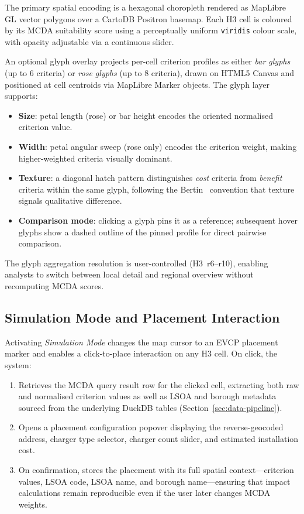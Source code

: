 The primary spatial encoding is a hexagonal choropleth rendered as MapLibre GL vector polygons over a CartoDB Positron basemap. Each H3 cell is coloured by its MCDA suitability score using a perceptually uniform \texttt{viridis} colour scale, with opacity adjustable via a continuous slider.

An optional glyph overlay projects per-cell criterion profiles as either \emph{bar glyphs} (up to 6 criteria) or \emph{rose glyphs} (up to 8 criteria), drawn on HTML5 Canvas and positioned at cell centroids via MapLibre Marker objects. The glyph layer supports:

\begin{itemize}[nosep]
    \item \textbf{Size}: petal length (rose) or bar height encodes the oriented normalised criterion value.
    \item \textbf{Width}: petal angular sweep (rose only) encodes the criterion weight, making higher-weighted criteria visually dominant.
    \item \textbf{Texture}: a diagonal hatch pattern distinguishes \emph{cost} criteria from \emph{benefit} criteria within the same glyph, following the Bertin~\cite{bertin1983semiology} convention that texture signals qualitative difference.
    \item \textbf{Comparison mode}: clicking a glyph pins it as a reference; subsequent hover glyphs show a dashed outline of the pinned profile for direct pairwise comparison.
\end{itemize}

\noindent The glyph aggregation resolution is user-controlled (H3~r6--r10), enabling analysts to switch between local detail and regional overview without recomputing MCDA scores.

\subsection{Simulation Mode and Placement Interaction}
\label{sec:simulation-mode}

Activating \emph{Simulation Mode} changes the map cursor to an EVCP placement marker and enables a click-to-place interaction on any H3 cell. On click, the system:

\begin{enumerate}[nosep]
    \item Retrieves the MCDA query result row for the clicked cell, extracting both raw and normalised criterion values as well as LSOA and borough metadata sourced from the underlying DuckDB tables (Section~\ref{sec:data-pipeline}).
    \item Opens a placement configuration popover displaying the reverse-geocoded address, charger type selector, charger count slider, and estimated installation cost.
    \item On confirmation, stores the placement with its full spatial context---criterion values, LSOA code, LSOA name, and borough name---ensuring that impact calculations remain reproducible even if the user later changes MCDA weights.
\end{enumerate}

